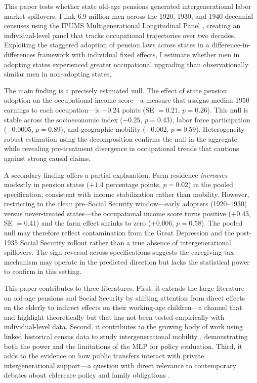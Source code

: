 \documentclass[12pt]{article}
\begin{document}
This paper tests whether state old-age pensions generated intergenerational labor market spillovers. I link 6.9 million men across the 1920, 1930, and 1940 decennial censuses using the IPUMS Multigenerational Longitudinal Panel \citep[MLP;][]{ruggles2024, abramitzky2021}, creating an individual-level panel that tracks occupational trajectories over two decades. Exploiting the staggered adoption of pension laws across states in a difference-in-differences framework with individual fixed effects, I estimate whether men in adopting states experienced greater occupational upgrading than observationally similar men in non-adopting states.

The main finding is a precisely estimated null. The effect of state pension adoption on the occupational income score---a measure that assigns median 1950 earnings to each occupation---is $-0.24$ points (SE $= 0.21$, $p = 0.26$). This null is stable across the socioeconomic index ($-0.25$, $p = 0.43$), labor force participation ($-0.0005$, $p = 0.89$), and geographic mobility ($-0.002$, $p = 0.59$). Heterogeneity-robust estimation using the \citet{sunAbraham2021} decomposition confirms the null in the aggregate while revealing pre-treatment divergence in occupational trends that cautions against strong causal claims.

A secondary finding offers a partial explanation. Farm residence \textit{increases} modestly in pension states ($+1.4$ percentage points, $p = 0.02$) in the pooled specification, consistent with income stabilization rather than mobility. However, restricting to the clean pre--Social Security window---early adopters (1920--1930) versus never-treated states---the occupational income score turns positive ($+0.43$, SE $= 0.41$) and the farm effect shrinks to zero ($+0.006$, $p = 0.58$). The pooled null may therefore reflect contamination from the Great Depression and the post-1935 Social Security rollout rather than a true absence of intergenerational spillovers. The sign reversal across specifications suggests the caregiving-tax mechanism may operate in the predicted direction but lacks the statistical power to confirm in this setting.

This paper contributes to three literatures. First, it extends the large literature on old-age pensions and Social Security \citep{costa1998, engelhardt2006, fishback2007} by shifting attention from direct effects on the elderly to indirect effects on their working-age children---a channel that \citet{becker1981} and \citet{cox1995} highlight theoretically but that has not been tested empirically with individual-level data. Second, it contributes to the growing body of work using linked historical census data to study intergenerational mobility \citep{abramitzky2012, abramitzky2014, bleakley2016}, demonstrating both the power and the limitations of the MLP for policy evaluation. Third, it adds to the evidence on how public transfers interact with private intergenerational support---a question with direct relevance to contemporary debates about eldercare policy and family obligations \citep{dahl2012, cox1995}.
\end{document}
